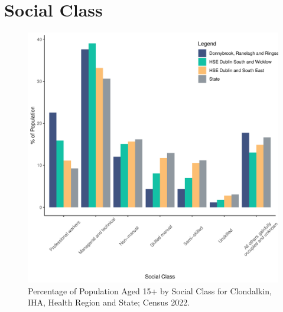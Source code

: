 \documentclass{article}
\begin{document}
\section{Social Class}\label{sect:SC}
\begin{figure}[H]
	\centering
	\includegraphics[width = 140mm]{../figures/SocialClassED.pdf}
	\caption{Percentage of Population Aged 15+ by Social Class for Clondalkin, IHA, Health Region and State; Census 2022.}
	\label{fig:vbnv}
	\end{figure}
\end{document}
